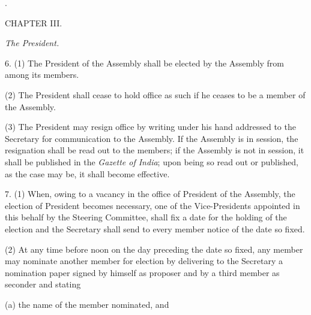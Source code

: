 \hypertarget{jump_id_8}{}\deleted{}\hspace{0pt}

\hypertarget{jump_id_8}{}\hspace{0pt}.



\begin{center}
CHAPTER III.\end{center}
\begin{center}
\emph{The President.}\end{center}


6. (1) The President of the Assembly shall be elected by the Assembly from among its members.



(2) The President shall cease to hold office as such if he ceases to be a member of the Assembly.



(3) The President may resign office by writing under his hand addressed to the Secretary for communication to the Assembly. If the Assembly is in session, the resignation shall be read out to the members; if the Assembly is not in session, it shall be published in the \emph{Gazette of India}; upon being so read out or published, as the case may be, it shall become effective.



7. (1) When, owing to a vacancy in the office of President of the Assembly, the election of President becomes necessary, one of the Vice-Presidents appointed in this behalf by the Steering Committee, shall fix a date for the holding of the election and the Secretary shall send to every member notice of the date so fixed.



(2) At any time before noon on the day preceding the date so fixed, any member may nominate another member for election by delivering to the Secretary a nomination paper signed by himself as proposer and by a third member as seconder and stating\textemdash{}



(a) the name of the member nominated, and

